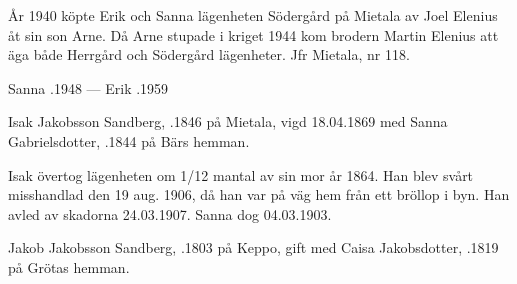 År 1940 köpte Erik och Sanna lägenheten Södergård på Mietala av Joel Elenius åt sin son Arne. Då Arne stupade i kriget 1944 kom brodern Martin Elenius att äga både Herrgård och Södergård lägenheter. Jfr Mietala, nr 118.

Sanna .1948  ---  Erik .1959


Isak Jakobsson Sandberg, .1846 på Mietala, vigd 18.04.1869 med Sanna Gabrielsdotter, .1844 på Bärs hemman.
\begin{jhchildren}
  \item {}
  \item {}
  \item {}
  \item {}
  \item {}
  \item {}
  \item {}
\end{jhchildren}

Isak övertog lägenheten om 1/12 mantal av sin mor år 1864. Han blev svårt misshandlad den 19 aug. 1906, då han var på väg hem från ett bröllop i byn. Han avled av skadorna 24.03.1907. Sanna dog 04.03.1903.


Jakob Jakobsson Sandberg, .1803 på Keppo, gift med Caisa Jakobsdotter, .1819 på Grötas hemman.
\begin{jhchildren}
  \item {}
  \item {}
  \item {}
  \item {}
  \item {}
  \item {}
\end{jhchildren}

